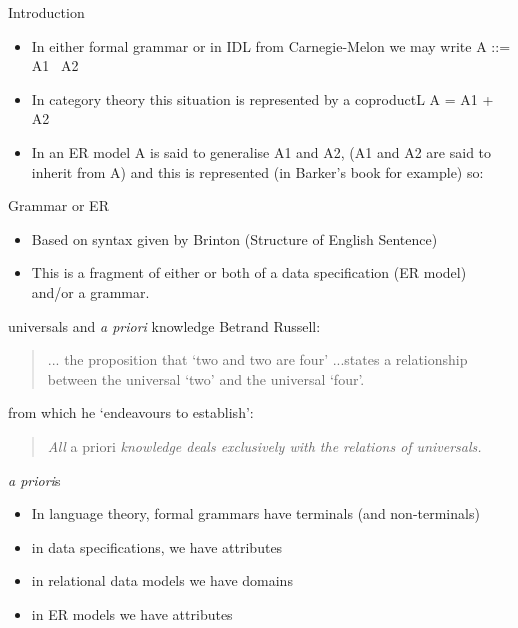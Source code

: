 \documentclass{beamer}
\renewcommand{\erpictureFolder}[0]{../SharedPictures}
\begin{document}
\begin{frame}{Introduction}
\begin{itemize}
\pause \item In either formal grammar or in IDL from Carnegie-Melon we may write A ::= A1 \textbar\  A2
\pause \item In category theory this situation is represented by a coproductL A = A1 + A2  
\pause \item In an ER model  A is said to generalise A1 and A2, (A1 and A2 are said to inherit from A) and this is represented
(in Barker's book for example) so:
\end{itemize}
\begin{center}
\scalebox{0.85}{

}
\end{center}
\end{frame}
\begin{frame}{Grammar or ER}
\begin{itemize}
\pause \item Based on syntax given by Brinton (Structure of English Sentence)
\end{itemize}
\begin{center}
\scalebox{0.85}{

}
\end{center}
\begin{itemize}
\pause \item This is a fragment of either or both of a data specification (ER model) and/or a grammar.
\end{itemize}
\end{frame}


\begin{frame}{universals and \textit{a priori} knowledge}
Betrand Russell:
\begin{quote}
... the proposition
that `two and two are four' 
...states a relationship between the universal `two' and the universal `four'.
\end{quote}
from which he `endeavours to establish':
\begin{quote}
\textit{All} a priori \textit{knowledge deals exclusively with the relations of universals.}
\end{quote}
\end{frame}

\begin{frame}{\textit{a priori}s}
\begin{itemize}
\item In language theory, formal grammars have terminals (and non-terminals)
\pause \item in data specifications, we have attributes
\pause \item in relational data models we have domains
\pause \item in ER models we have attributes 

\end{itemize}

\end{frame}
\end{document}
